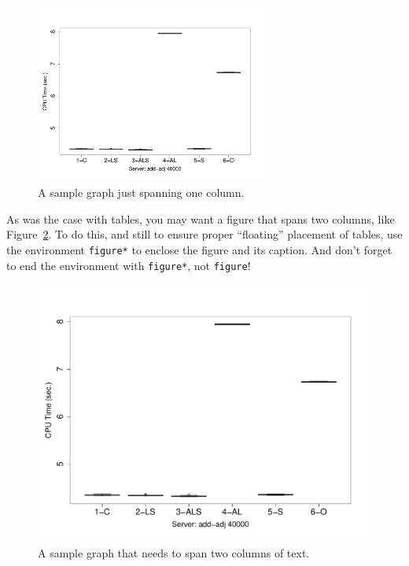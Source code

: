\documentclass[sigplan,screen,nonacm]{acmart}
\begin{document}
\begin{figure}
\centering
\includegraphics[width=3in]{sample_graph.pdf}
\caption{A sample graph just spanning one column.}
\label{fig:singleColumnFigure}
\end{figure}


As was the case with tables, you may want a figure
that spans two columns, like Figure~\ref{fig:twoColumnFigure}.  
To do this, and still to
ensure proper ``floating'' placement of tables, use the environment
\texttt{figure*} to enclose the figure and its caption.
And don't forget to end the environment with
\texttt{figure*}, not \texttt{figure}!

\begin{figure}
\centering
\includegraphics[width=\textwidth]{sample_graph.pdf}
\caption{A sample graph that needs to span two columns of text.}
\label{fig:twoColumnFigure}
\end{figure}
\end{document}
